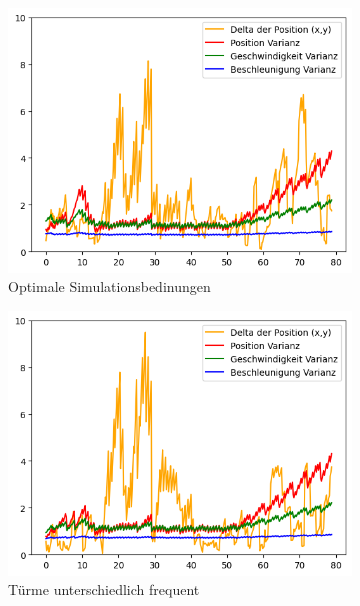 \begin{figure}
    \begin{subfigure}{.333\textwidth}
        \centering
        \includegraphics[width=.9\linewidth]{Ergebnisse/plots_ungenauigkeiten/distanz/distanz_dyn_acc_flag_freq.png}
        \caption{Optimale Simulationsbedinungen}
    \end{subfigure}    
    \begin{subfigure}{.333\textwidth}
        \centering
        \includegraphics[width=.9\linewidth]{Ergebnisse/plots_ungenauigkeiten/distanz/distanz_dyn_acc_freq.png}
        \caption{Türme unterschiedlich frequent}
    \end{subfigure}    
    \begin{subfigure}{.333\textwidth}
        \centering

\end{subfigure}
\end{figure}
